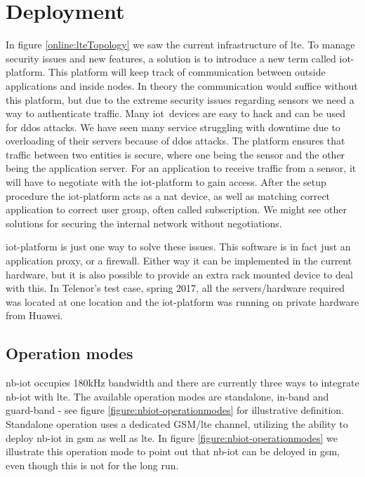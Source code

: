 \documentclass[USenglish]{ifimaster}  %
\begin{document}
\section{Deployment} \label{section:nb-iot-deployment} %
In figure \vref{online:lteTopology} we saw the current infrastructure of \acrshort{lte}. To manage security issues and new features, a solution is to introduce a new term called \acrfull{iot-platform}. This platform will keep track of communication between outside applications and inside nodes. In theory the communication would suffice without this platform, but due to the extreme security issues regarding sensors we need a way to authenticate traffic. Many \acrshort{iot} devices are easy to hack and can be used for \acrfull{ddos} attacks. We have seen many service struggling with downtime due to overloading of their servers because of \acrshort{ddos} attacks. The platform ensures that traffic between two entities is secure, where one being the sensor and the other being the application server. For an application to receive traffic from a sensor, it will have to negotiate with the \acrshort{iot-platform} to gain access. After the setup procedure the \acrshort{iot-platform} acts as a \acrshort{nat} device, as well as matching correct application to correct user group, often called subscription. We might see other solutions for securing the internal network without negotiations.

\acrshort{iot-platform} is just one way to solve these issues. This software is in fact just an application proxy, or a firewall. Either way it can be implemented in the current hardware, but it is also possible to provide an extra rack mounted device to deal with this. In Telenor's test case, spring 2017, all the servers/hardware required was located at one location and the \acrshort{iot-platform} was running on private hardware from Huawei.

\subsection{Operation modes} \label{ssection:operationmodes}
\acrshort{nb-iot} occupies 180kHz bandwidth and there are currently three ways to integrate \acrshort{nb-iot} with \acrshort{lte}. The available operation modes are standalone, in-band and guard-band - see figure \vref{figure:nbiot-operationmodes} for illustrative definition. Standalone operation uses a dedicated GSM/\acrshort{lte} channel, utilizing the ability to deploy \acrshort{nb-iot} in \acrshort{gsm} as well as \acrshort{lte}. In figure \vref{figure:nbiot-operationmodes} we illustrate this operation mode to point out that \acrshort{nb-iot} can be deloyed in \acrshort{gsm}, even though this is not for the long run.
\end{document}
